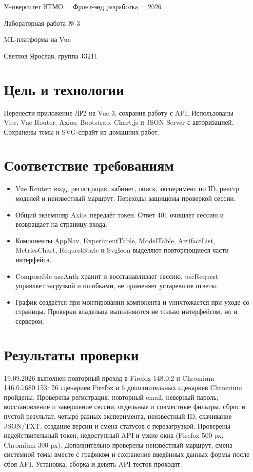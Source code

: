 \documentclass[11pt,a4paper]{article}
\begin{document}
\begin{center}
{\small Университет ИТМО · Фронт-энд разработка · 2026}\par
{\LARGE Лабораторная работа № 3}\par
{\large ML-платформа на Vue}\par
Светлов Ярослав, группа J3211
\end{center}
\section*{Цель и технологии}
Перенести приложение ЛР2 на Vue 3, сохранив работу с API. Использованы Vite, Vue Router, Axios, Bootstrap, Chart.js и JSON Server с авторизацией. Сохранены темы и SVG-спрайт из домашних работ.
\section*{Соответствие требованиям}
\begin{itemize}
\item Vue Router: вход, регистрация, кабинет, поиск, эксперимент по ID, реестр моделей и неизвестный маршрут. Переходы защищены проверкой сессии.
\item Общий экземпляр Axios передаёт токен. Ответ 401 очищает сессию и возвращает на страницу входа.
\item Компоненты AppNav, ExperimentTable, ModelTable, ArtifactList, MetricsChart, RequestState и SvgIcon выделяют повторяющиеся части интерфейса.
\item Composable useAuth хранит и восстанавливает сессию. useRequest управляет загрузкой и ошибками, не применяет устаревшие ответы.
\item График создаётся при монтировании компонента и уничтожается при уходе со страницы. Проверки владельца выполняются не только интерфейсом, но и сервером.
\end{itemize}

\section*{Результаты проверки}
19.09.2026 выполнен повторный проход в Firefox 148.0.2 и Chromium 146.0.7680.153: 26 сценариев Firefox и 6 дополнительных сценариев Chromium пройдены. Проверены регистрация, повторный email, неверный пароль, восстановление и завершение сессии, отдельные и совместные фильтры, сброс и пустой результат, четыре разных эксперимента, неизвестный ID, скачивание JSON/TXT, создание версии и смена статусов с перезагрузкой. Проверены недействительный токен, недоступный API и узкие окна (Firefox 500 px, Chromium 390 px). Дополнительно проверены неизвестный маршрут, смена системной темы вместе с графиком и сохранение введённых данных формы после сбоя API. Установка, сборка и девять API-тестов проходят.
\end{document}
